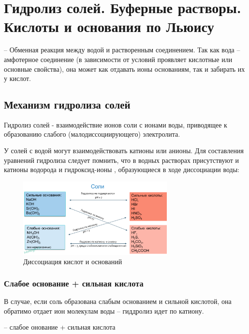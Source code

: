 \section{Гидролиз солей. Буферные растворы. Кислоты и основания по Льюису}

 -- Обменная реакция между водой и растворенным соединением. Так как вода -- амфотерное соединение (в зависимости от условий проявляет кислотные или основные свойства), она может как отдавать ионы  основаниям, так и забирать их у кислот.

\subsection{Механизм гидролиза солей}

Гидролиз солей - взаимодействие ионов соли с ионами воды, приводящее к образованию слабого (малодиссоциирующего) электролита.

У солей с водой могут взаимодействовать катионы или анионы. Для составления уравнений гидролиза следует помнить, что в водных растворах присутствуют и катионы водорода  и гидроксид-ионы , образующиеся в ходе диссоциации воды:


\begin{figure}[H]
    \centering
    \includegraphics[width = 0.7\textwidth]{TeX/Pictures/17_acidbase.png}
    \caption{Диссоциация кислот и оснований}
    \label{fig:acidbase}
\end{figure}

\subsubsection{Слабое основание + сильная кислота}

В случае, если соль образована слабым основанием и сильной кислотой, она обратимо отдает ион  молекулам воды -- гиддролиз идет по катиону.


 -- слабое онование + сильная кислота

